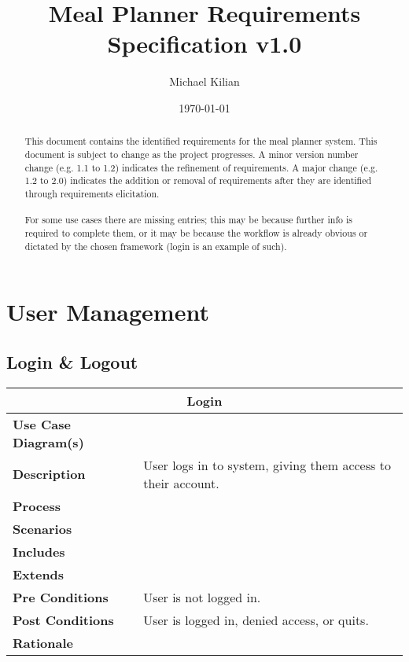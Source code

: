 \documentclass[12pt]{article}
\begin{document}
\title{Meal Planner Requirements Specification v1.0}

\author{
        Michael Kilian
}
\date{\today}

\maketitle
\tableofcontents

\begin{abstract}
This document contains the identified requirements for the meal planner system. This document is subject to change as the project progresses. A minor version number change (e.g. 1.1 to 1.2) indicates the refinement of requirements. A major change (e.g. 1.2 to 2.0) indicates the addition or removal of requirements after they are identified through requirements elicitation.\\\\
For some use cases there are missing entries; this may be because further info is required to complete them, or it may be because the workflow is already obvious or dictated by the chosen framework (login is an example of such).
\end{abstract}


\section{User Management}

\subsection{Login \& Logout}
\begin{center}
\begin{tabularx}{\textwidth}{ |X|X|}
\hline
\multicolumn{2}{|c|}{\textbf{Login}}\\
\hline
\hline
\textbf{Use Case Diagram(s)} & \\ \hline
\textbf{Description} & User logs in to system, giving them access to their account. \\ \hline
\textbf{Process} & \\ \hline
\textbf{Scenarios} & \\ \hline
\textbf{Includes} & \\ \hline
\textbf{Extends} & \\ \hline
\textbf{Pre Conditions} & User is not logged in.\\ \hline
\textbf{Post Conditions} & User is logged in, denied access, or quits.\\ \hline
\textbf{Rationale} & \\ \hline
\end{tabularx}
\end{center}
\end{document}
